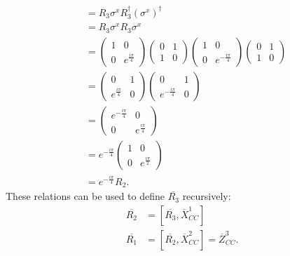 \documentclass[12pt]{article}
\theoremstyle{definition}
\begin{document}
    \begin{align}
        [R_3,\sigma^x] &= R_3\sigma^xR^\dagger_3(\sigma^x)^\dagger\\
        &= R_3\sigma^xR_3\sigma^x\\
        &= \begin{pmatrix}
            1 & 0 \\
            0 & e^{\frac{i\pi}{4}}
            \end{pmatrix}
            \begin{pmatrix}
            0 & 1 \\
            1 & 0
            \end{pmatrix}
            \begin{pmatrix}
            1 & 0 \\
            0 & e^{-\frac{i\pi}{4}}
            \end{pmatrix}
            \begin{pmatrix}
            0 & 1 \\
            1 & 0
            \end{pmatrix}\\
        &= \begin{pmatrix}
            0 & 1 \\
            e^{\frac{i\pi}{4}} & 0
            \end{pmatrix}
            \begin{pmatrix}
            0 & 1 \\
            e^{-\frac{i\pi}{4}} & 0
            \end{pmatrix}\\
        &= \begin{pmatrix}
            e^{-\frac{i\pi}{4}} & 0 \\
            0 & e^{\frac{i\pi}{4}}
            \end{pmatrix}\\
        &= e^{-\frac{i\pi}{4}}
            \begin{pmatrix}
            1 & 0 \\
            0 &  e^{\frac{i\pi}{2}}
            \end{pmatrix}\\
        &= e^{-\frac{i\pi}{4}}R_2 .
    \end{align}
These relations can be used to define $\overline{R_3}$ recursively:
    \begin{align}
        \overline{R_2} &= [\overline{R_3}, \overline{X}^1_{CC}]\\
        \overline{R_1} &= [\overline{R_2}, \overline{X}^2_{CC}] = \overline{Z}^3_{CC} .
    \end{align}
\end{document}
